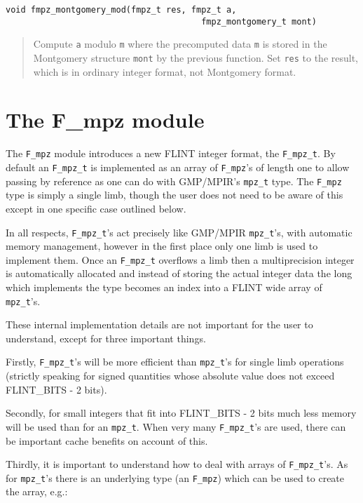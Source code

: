 \documentclass[a4paper,10pt]{article}
\newcommand{\code}{\lstinline}
\begin{document}
\begin{lstlisting}
void fmpz_montgomery_mod(fmpz_t res, fmpz_t a, 
                                       fmpz_montgomery_t mont)
\end{lstlisting}
\begin{quote}
Compute \code{a} modulo \code{m} where the precomputed data \code{m} is stored in the Montgomery structure \code{mont} by the previous function. Set \code{res} to the result, which is in ordinary integer format, not Montgomery format.
\end{quote}

\section{The F\_mpz module}

The \code{F_mpz} module introduces a new FLINT integer format, the \code{F_mpz_t}. By default an \code{F_mpz_t} is implemented as an array of \code{F_mpz}'s of length one to allow passing by reference as one can do with GMP/MPIR's \code{mpz_t} type. The \code{F_mpz} type is simply a single limb, though the user does not need to be aware of this except in one specific case outlined below.

In all respects, \code{F_mpz_t}'s act precisely like GMP/MPIR \code{mpz_t}'s, with automatic memory management, however in the first place only one limb is used to implement them. Once an \code{F_mpz_t} overflows a limb then a multiprecision integer is automatically allocated and instead of storing the actual integer data the long which implements the type becomes an index into a FLINT wide array of \code{mpz_t}'s.

These internal implementation details are not important for the user to understand, except for three important things.

Firstly, \code{F_mpz_t}'s will be more efficient than \code{mpz_t}'s for single limb operations (strictly speaking for signed quantities whose absolute value does not exceed FLINT\_BITS - 2 bits).

Secondly, for small integers that fit into FLINT\_BITS - 2 bits much less memory will be used than for an \code{mpz_t}. When very many \code{F_mpz_t}'s are used, there can be important cache benefits on account of this.

Thirdly, it is important to understand how to deal with arrays of \code{F_mpz_t}'s. As for \code{mpz_t}'s there is an underlying type (an \code{F_mpz}) which can be used to create the array, e.g.:
\end{document}
